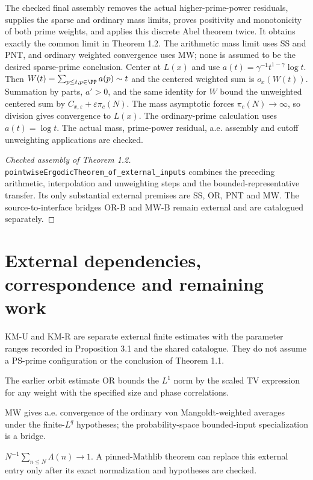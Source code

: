 The checked final assembly removes the actual higher-prime-power residuals, supplies the sparse and ordinary mass limits, proves positivity and monotonicity of both prime weights, and applies this discrete Abel theorem twice. It obtains exactly the common limit in Theorem 1.2. The arithmetic mass limit uses SS and PNT, and ordinary weighted convergence uses MW; none is assumed to be the desired sparse-prime conclusion.
\else
Center at $L(x)$ and use $a(t)=\gamma^{-1}t^{1-\gamma}\log t$. Then $W(t)=\sum_{p\leq t,p\in\PP}a(p)\sim t$ and the centered weighted sum is $o_x(W(t))$. Summation by parts, $a'>0$, and the same identity for $W$ bound the unweighted centered sum by $C_{x,\varepsilon}+\varepsilon\pi_c(N)$. The mass asymptotic forces $\pi_c(N)\to\infty$, so division gives convergence to $L(x)$. The ordinary-prime calculation uses $a(t)=\log t$. The actual mass, prime-power residual, a.e. assembly and cutoff unweighting applications are checked.
\fi
\begin{proof}[Checked assembly of Theorem 1.2]
\leanok
\texttt{pointwiseErgodicTheorem\_\allowbreak{}of\_\allowbreak{}external\_\allowbreak{}inputs} combines the preceding arithmetic, interpolation and unweighting steps and the bounded-representative transfer. Its only substantial external premises are SS, OR, PNT and MW. The source-to-interface bridges OR-B and MW-B remain external and are catalogued separately.
\end{proof}

\section*{External dependencies, correspondence and remaining work}
\begin{inputthm}\label{input:KM}
KM-U and KM-R are separate external finite estimates with the parameter ranges recorded in Proposition 3.1 and the shared catalogue. They do not assume a PS-prime configuration or the conclusion of Theorem 1.1.
\end{inputthm}
\begin{inputthm}\label{input:OR}
The earlier orbit estimate OR bounds the $L^1$ norm by the scaled TV expression for any weight with the specified size and phase correlations.
\end{inputthm}
\begin{inputthm}\label{input:MW}
MW gives a.e. convergence of the ordinary von Mangoldt-weighted averages under the finite-$L^q$ hypotheses; the probability-space bounded-input specialization is a bridge.
\end{inputthm}
\begin{inputthm}\label{input:PNT}
$N^{-1}\sum_{n\leq N}\Lambda(n)\to1$. A pinned-Mathlib theorem can replace this external entry only after its exact normalization and hypotheses are checked.
\end{inputthm}

